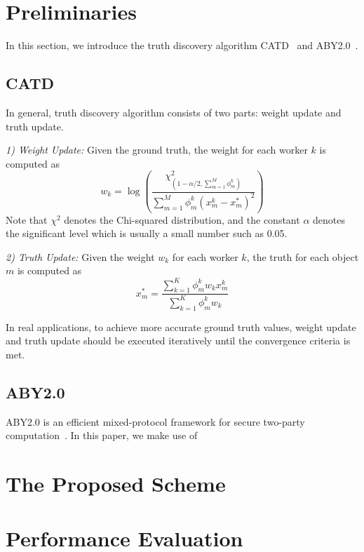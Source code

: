 \documentclass[conference]{IEEEtran}
\begin{document}
\section{Preliminaries}

In this section, we introduce the truth discovery algorithm CATD~\cite{li_confidence-aware_2014} and ABY2.0~\cite{patra_aby20_2020}.


\subsection{CATD}

In general, truth discovery algorithm consists of two parts: weight update and truth update.

\textit{1) Weight Update:} Given the ground truth, the weight for each worker $k$ is computed as
\begin{equation}
w_k = \log (\frac{\chi^2_{(1-\alpha/2,\sum_{m=1}^M \phi_m^k)}}{\sum_{m=1}^M \phi_m^k(x_m^k - x_m^*)^2})
\end{equation}
Note that $\chi^2$ denotes the Chi-squared distribution, and the constant $\alpha$ denotes the significant level which is usually a small number such as 0.05.

\textit{2) Truth Update:} Given the weight $w_k$ for each worker $k$, the truth for each object $m$ is computed as
\begin{equation}
x_m^* = \frac{\sum_{k=1}^K \phi_m^k w_k x_m^k}{\sum_{k=1}^K \phi_m^k w_k }
\end{equation}

In real applications, to achieve more accurate ground truth values, weight update and truth update should be executed iteratively until the convergence criteria is met.


\subsection{ABY2.0}

ABY2.0 is an efficient mixed-protocol framework for secure two-party computation~\cite{patra_aby20_2020}.
In this paper, we make use of 


\section{The Proposed Scheme}

\section{Performance Evaluation}




\vspace{12pt}
\end{document}
